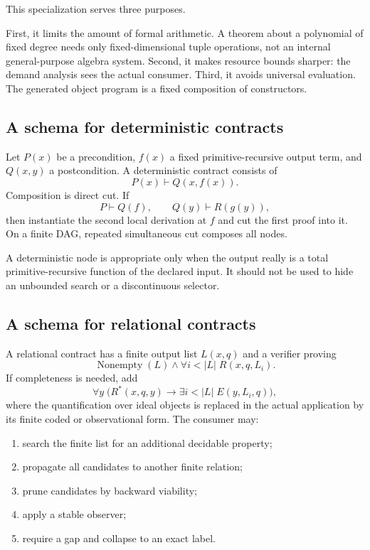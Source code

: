 This specialization serves three purposes.

First, it limits the amount of formal arithmetic.  A theorem about a polynomial of fixed degree needs only fixed-dimensional tuple operations, not an internal general-purpose algebra system.  Second, it makes resource bounds sharper: the demand analysis sees the actual consumer.  Third, it avoids universal evaluation.  The generated object program is a fixed composition of  constructors.

\subsection{A schema for deterministic contracts}

Let \(P(x)\) be a precondition, \(f(x)\) a fixed primitive-recursive output term, and \(Q(x,y)\) a postcondition.  A deterministic contract consists of
\[
 P(x)\vdash Q(x,f(x)).
\]
Composition is direct cut.  If
\[
 P\vdash Q(f),\qquad Q(y)\vdash R(g(y)),
\]
then instantiate the second local derivation at \(f\) and cut the first proof into it.  On a finite DAG, repeated simultaneous cut composes all nodes.

A deterministic node is appropriate only when the output really is a total primitive-recursive function of the declared input.  It should not be used to hide an unbounded search or a discontinuous selector.

\subsection{A schema for relational contracts}

A relational contract has a finite output list \(L(x,q)\) and a verifier proving
\[
 \operatorname{Nonempty}(L)\wedge
 \forall i<|L|\;R(x,q,L_i).
\]
If completeness is needed, add
\[
 \forall y\;\bigl(R^*(x,q,y)\to \exists i<|L|\;E(y,L_i,q)\bigr),
\]
where the quantification over ideal objects is replaced in the actual application by its finite coded or observational form.  The consumer may:
\begin{enumerate}
\item search the finite list for an additional decidable property;
\item propagate all candidates to another finite relation;
\item prune candidates by backward viability;
\item apply a stable observer;
\item require a gap and collapse to an exact label.
\end{enumerate}

